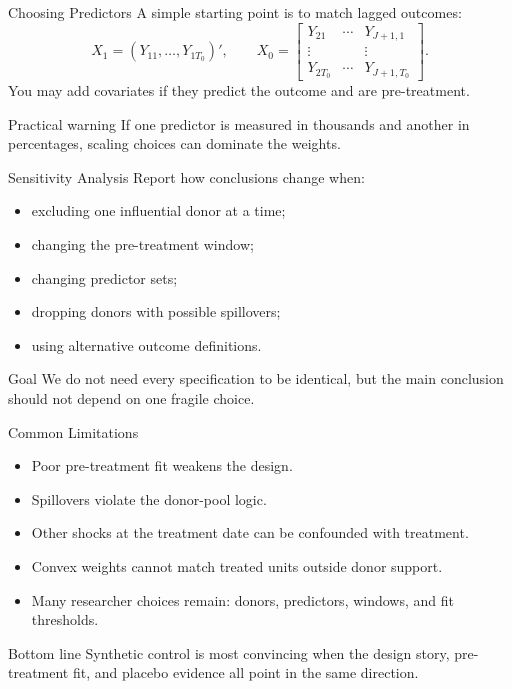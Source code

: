 \documentclass[11pt,aspectratio=169]{beamer}
\begin{document}
\begin{frame}{Choosing Predictors}
  A simple starting point is to match lagged outcomes:
  \[
    X_1=(Y_{11},\ldots,Y_{1T_0})',
    \qquad
    X_0=
    \begin{bmatrix}
      Y_{21} & \cdots & Y_{J+1,1}\\
      \vdots & & \vdots\\
      Y_{2T_0} & \cdots & Y_{J+1,T_0}
    \end{bmatrix}.
  \]
  You may add covariates if they predict the outcome and are pre-treatment.
  \begin{block}{Practical warning}
    If one predictor is measured in thousands and another in percentages, scaling choices can dominate the weights.
  \end{block}
\end{frame}

\begin{frame}{Sensitivity Analysis}
  Report how conclusions change when:
  \begin{itemize}
    \item excluding one influential donor at a time;
    \item changing the pre-treatment window;
    \item changing predictor sets;
    \item dropping donors with possible spillovers;
    \item using alternative outcome definitions.
  \end{itemize}
  \begin{block}{Goal}
    We do not need every specification to be identical, but the main conclusion should not depend on one fragile choice.
  \end{block}
\end{frame}

\begin{frame}{Common Limitations}
  \begin{itemize}
    \item Poor pre-treatment fit weakens the design.
    \item Spillovers violate the donor-pool logic.
    \item Other shocks at the treatment date can be confounded with treatment.
    \item Convex weights cannot match treated units outside donor support.
    \item Many researcher choices remain: donors, predictors, windows, and fit thresholds.
  \end{itemize}
  \begin{block}{Bottom line}
    Synthetic control is most convincing when the design story, pre-treatment fit, and placebo evidence all point in the same direction.
  \end{block}
\end{frame}
\end{document}
